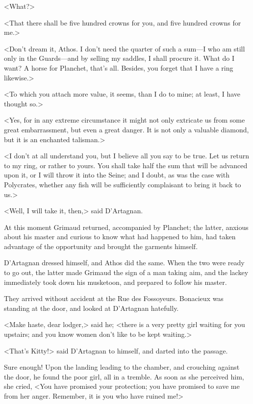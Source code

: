 <What?> 

<That there shall be five hundred crowns for you, and five hundred crowns for me.> 

<Don't dream it, Athos. I don't need the quarter of such a sum—I who am still only in the Guards—and by selling my saddles, I shall procure it. What do I want? A horse for Planchet, that's all. Besides, you forget that I have a ring likewise.> 

<To which you attach more value, it seems, than I do to mine; at least, I have thought so.> 

<Yes, for in any extreme circumstance it might not only extricate us from some great embarrassment, but even a great danger. It is not only a valuable diamond, but it is an enchanted talisman.> 

<I don't at all understand you, but I believe all you say to be true. Let us return to my ring, or rather to yours. You shall take half the sum that will be advanced upon it, or I will throw it into the Seine; and I doubt, as was the case with Polycrates, whether any fish will be sufficiently complaisant to bring it back to us.> 

<Well, I will take it, then,> said D'Artagnan. 

At this moment Grimaud returned, accompanied by Planchet; the latter, anxious about his master and curious to know what had happened to him, had taken advantage of the opportunity and brought the garments himself. 

D'Artagnan dressed himself, and Athos did the same. When the two were ready to go out, the latter made Grimaud the sign of a man taking aim, and the lackey immediately took down his musketoon, and prepared to follow his master. 

They arrived without accident at the Rue des Fossoyeurs. Bonacieux was standing at the door, and looked at D'Artagnan hatefully. 

<Make haste, dear lodger,> said he; <there is a very pretty girl waiting for you upstairs; and you know women don't like to be kept waiting.> 

<That's Kitty!> said D'Artagnan to himself, and darted into the passage. 

Sure enough! Upon the landing leading to the chamber, and crouching against the door, he found the poor girl, all in a tremble. As soon as she perceived him, she cried, <You have promised your protection; you have promised to save me from her anger. Remember, it is you who have ruined me!> 

